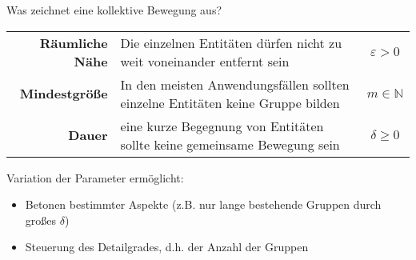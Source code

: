 \documentclass[
wide,
10pt,
xcolor={x11names,svgnames},
hyperref={pdfauthor={Jannes Bantje},colorlinks,urlcolor=maincolor,hidelinks=false,linkcolor=maincolor},
pantone312, 	%
]{beamer}
\newcommand{\bet}[1]{\textbf{\color{maincolor}#1}}
\theoremstyle{definition}
\begin{document}
\begin{frame}{Was zeichnet eine kollektive Bewegung aus?}
    \begin{tabular}{rp{8cm}c}
        \bet{Räumliche Nähe} & Die einzelnen Entitäten dürfen nicht zu weit voneinander entfernt sein & $\varepsilon>0$\\
        \bet{Mindestgröße} & In den meisten Anwendungsfällen sollten einzelne Entitäten keine Gruppe bilden & $m \in \mathbb{N}$ \\
        \bet{Dauer} & eine kurze Begegnung von Entitäten sollte keine gemeinsame Bewegung sein & $\delta \ge 0$ \\
    \end{tabular}
    \vspace{1em}
    
    Variation der Parameter ermöglicht:
    \begin{itemize}
        \item Betonen bestimmter Aspekte (z.B. nur lange bestehende Gruppen durch großes $\delta$)
        \item Steuerung des Detailgrades, d.h. der Anzahl der Gruppen
    \end{itemize}
\end{frame}
\end{document}

